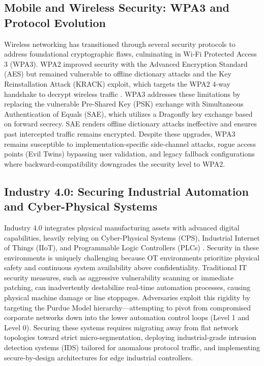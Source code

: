 \documentclass[11pt,a4paper]{article}
\begin{document}
\subsection{Mobile and Wireless Security: WPA3 and Protocol Evolution}
Wireless networking has transitioned through several security protocols to address foundational cryptographic flaws, culminating in Wi-Fi Protected Access 3 (WPA3). WPA2 improved security with the Advanced Encryption Standard (AES) but remained vulnerable to offline dictionary attacks and the Key Reinstallation Attack (KRACK) exploit, which targets the WPA2 4-way handshake to decrypt wireless traffic \cite{b10}. WPA3 addresses these limitations by replacing the vulnerable Pre-Shared Key (PSK) exchange with Simultaneous Authentication of Equals (SAE), which utilizes a Dragonfly key exchange based on forward secrecy. SAE renders offline dictionary attacks ineffective and ensures past intercepted traffic remains encrypted. Despite these upgrades, WPA3 remains susceptible to implementation-specific side-channel attacks, rogue access points (Evil Twins) bypassing user validation, and legacy fallback configurations where backward-compatibility downgrades the security level to WPA2.

\subsection{Industry 4.0: Securing Industrial Automation and Cyber-Physical Systems}
Industry 4.0 integrates physical manufacturing assets with advanced digital capabilities, heavily relying on Cyber-Physical Systems (CPS), Industrial Internet of Things (IIoT), and Programmable Logic Controllers (PLCs) \cite{b1}. Security in these environments is uniquely challenging because OT environments prioritize physical safety and continuous system availability above confidentiality. Traditional IT security measures, such as aggressive vulnerability scanning or immediate patching, can inadvertently destabilize real-time automation processes, causing physical machine damage or line stoppages. Adversaries exploit this rigidity by targeting the Purdue Model hierarchy—attempting to pivot from compromised corporate networks down into the lower automation control loops (Level 1 and Level 0). Securing these systems requires migrating away from flat network topologies toward strict micro-segmentation, deploying industrial-grade intrusion detection systems (IDS) tailored for anomalous protocol traffic, and implementing secure-by-design architectures for edge industrial controllers.
\end{document}
